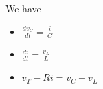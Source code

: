 \documentclass[preview]{standalone}
\begin{document}
\begin{center}
\raggedright
                We have 
                \begin{itemize}
                  \item $\frac{dv_C}{dt} = \frac{i}{C}$
                  \item $\frac{di}{dt} = \frac{v_L}{L}$
                  \item $v_T - Ri = v_C + v_L $
                \end{itemize}
\end{center}
\end{document}
